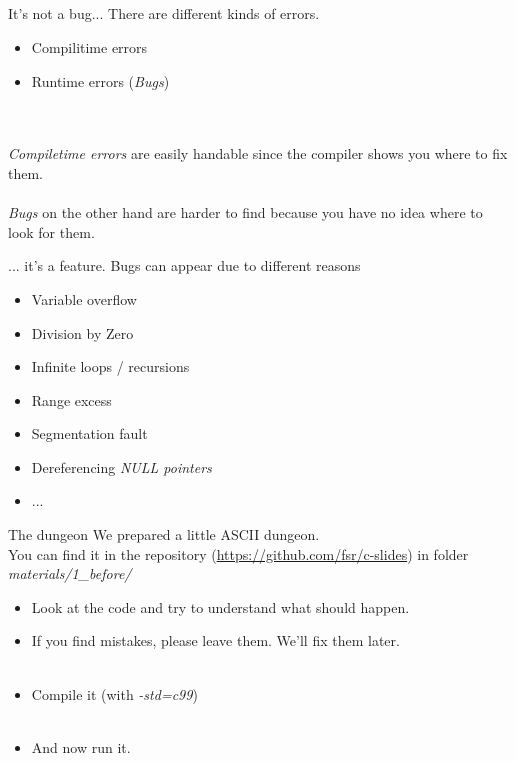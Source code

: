 \subsection{}
\begin{frame}{It's not a bug...}
	There are different kinds of errors.
	\begin{itemize}
		\item Compilitime errors
		\item Runtime errors (\textit{Bugs})
	\end{itemize}\ \\\ \\
	\textit{Compiletime errors} are easily handable since the compiler shows you where to fix them.\\\ \\
	\textit{Bugs} on the other hand are harder to find because you have no idea where to look for them.
\end{frame}
\begin{frame}{... it's a feature.}
	Bugs can appear due to different reasons
	\begin{itemize}
		\item Variable overflow
		\item Division by Zero
		\item Infinite loops / recursions
		\item Range excess
		\item Segmentation fault
		\item Dereferencing \textit{NULL pointers}
		\item ...
	\end{itemize}
\end{frame}
\begin{frame}{The dungeon}
	We prepared a little ASCII dungeon.\\
	You can find it in the repository (\url{https://github.com/fsr/c-slides}) in folder \textit{materials/1\_before/}\\
	\begin{itemize}
		\item Look at the code and try to understand what should happen.
		\item If you find mistakes, please leave them. We'll fix them later.
		\\\ 
		\item Compile it (with \textit{-std=c99})
		\\\ 
		\item And now run it.
	\end{itemize}
	
\end{frame}
